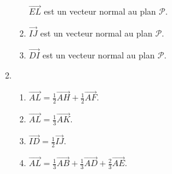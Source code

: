 \begin{enumerate}
\begin{enumerate}
          $\overrightarrow{EL}$ est un vecteur normal au plan $\mathscr P$.
          \item
          $\overrightarrow{IJ}$ est un vecteur normal au plan $\mathscr P$.
          \item
     $\overrightarrow{DI}$ est un vecteur normal au plan $\mathscr P$.\end{enumerate}
     \item
     \begin{enumerate}
          \item
          $\overrightarrow{AL}=\frac{1}{2}\overrightarrow{AH}+\frac{1}{2}\overrightarrow{AF}$.
          \item
          $\overrightarrow{AL}=\frac{1}{3}\overrightarrow{AK}$.
          \item
          $\overrightarrow{ID}=\frac{1}{2}\overrightarrow{IJ}$.
          \item
     $\overrightarrow{AL}=\frac{1}{3}\overrightarrow{AB}+\frac{1}{3}\overrightarrow{AD}+\frac{2}{3} \overrightarrow{AE}$.\end{enumerate}
\end{enumerate}
